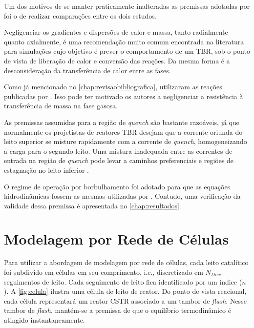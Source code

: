 Um dos motivos de se manter praticamente inalteradas as premissas adotadas por
 foi o de realizar comparações entre os dois estudos.

Negligenciar os gradientes e dispersões de calor e massa, tanto radialmente
quanto axialmente, é uma recomendação muito comum encontrada na literatura
\cite{Ancheyta2011, Ranade2011, Froment2011} para simulações cujo objetivo é
prever o comportamento de um TBR, sob o ponto de vista de liberação de calor e
conversão das reações. Da mesma forma é a desconsideração da transferência de
calor entre as fases.

Como já mencionado no \autoref{chap:revisaobibliografica},
 utilizaram as reações publicadas por
. Isso pode ter motivado os autores a negligenciar a
resistência à transferência de massa na fase gasosa.

As premissas assumidas para a região de \emph{quench} são bastante razoáveis, já
que normalmente os projetistas de reatores TBR desejam que a corrente oriunda do
leito superior se misture rapidamente com a corrente de \emph{quench},
homogeneizando a carga para o segundo leito. Uma mistura inadequada entre as
correntes de entrada na região de \emph{quench} pode levar a caminhos
preferenciais e regiões de estagnação no leito inferior \cite{Ancheyta2011}.

O regime de operação por borbulhamento foi adotado para que as
equações hidrodinâmicas fossem as mesmas utilizadas por .
Contudo, uma verificação da validade dessa premissa é apresentada no
\autoref{chap:resultados}.

\section{Modelagem por Rede de Células} \label{sec:modelagemredecelulas}

Para utilizar a abordagem de modelagem por rede de células, cada leito
catalítico foi subdivido em células em seu comprimento, i.e., discretizado em
$N_{Disc}$ seguimentos de leito. Cada seguimento de leito fica identificado por
um índice ($n$). A \autoref{fig:celula} ilustra uma célula de leito de
reator. Do ponto de vista reacional, cada célula representará um reator CSTR
associado a um tambor de \emph{flash}. Nesse tambor de \emph{flash}, mantém-se a
premissa de que o equilíbrio termodinâmico é atingido instantaneamente.

